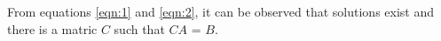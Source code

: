 \documentclass[journal,12pt,twocolumn]{IEEEtran}
\renewcommand\thesection{\arabic{section}}
\begin{document}
From equations \ref{eqn:1} and \ref{eqn:2}, it can be observed that solutions exist and there is a matric $C$ such that $CA$ = $B$.
%
\end{document}
